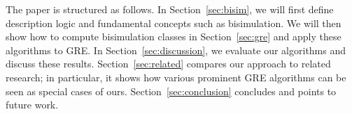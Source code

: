 The paper is structured as follows.  In Section~\ref{sec:bisim}, we
will first define description logic and fundamental concepts such as
bisimulation.  We will then show how to compute bisimulation classes
in Section~\ref{sec:gre} and apply these algorithms to GRE.  In
Section~\ref{sec:discussion}, we evaluate our algorithms and discuss
these results.  Section~\ref{sec:related} compares our approach to
related research; in particular, it shows how various prominent GRE
algorithms can be seen as special cases of ours.
Section~\ref{sec:conclusion} concludes and points to future work.






